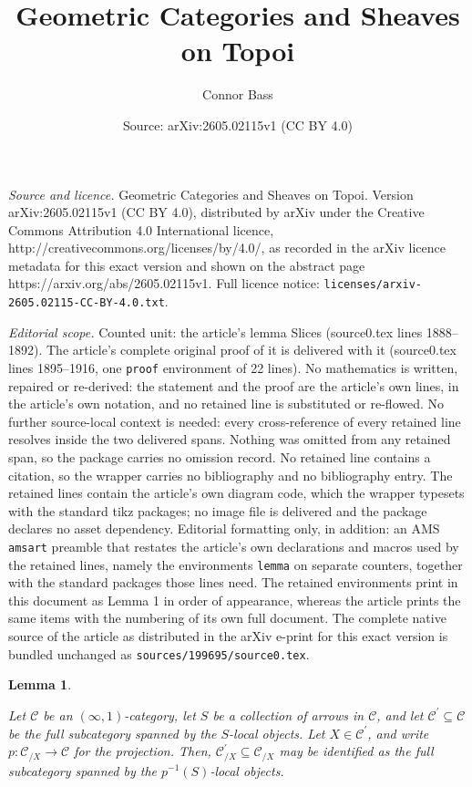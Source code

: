 \documentclass[10pt,a4paper]{amsart}
\title{Geometric Categories and Sheaves on Topoi}
\author{Connor Bass}
\date{Source: arXiv:2605.02115v1 (CC BY 4.0)}
\newtheorem{lemma}{Lemma}
\newcommand{\C}{\mathcal C}
\begin{document}
\maketitle

\noindent\emph{Source and licence.} Geometric Categories and Sheaves on Topoi. Version arXiv:2605.02115v1 (CC BY 4.0), distributed by arXiv under the Creative Commons Attribution 4.0 International licence, http://creativecommons.org/licenses/by/4.0/, as recorded in the arXiv licence metadata for this exact version and shown on the abstract page https://arxiv.org/abs/2605.02115v1. Full licence notice: \texttt{licenses/arxiv-2605.02115-CC-BY-4.0.txt}.\par\smallskip

\noindent\textit{Editorial scope.} Counted unit: the article's lemma Slices (source0.tex lines 1888--1892). The article's complete original proof of it is delivered with it (source0.tex lines 1895--1916, one \texttt{proof} environment of 22 lines). No mathematics is written, repaired or re-derived: the statement and the proof are the article's own lines, in the article's own notation, and no retained line is substituted or re-flowed.  No further source-local context is needed: every cross-reference of every retained line resolves inside the two delivered spans.  Nothing was omitted from any retained span, so the package carries no omission record.  No retained line contains a citation, so the wrapper carries no bibliography and no bibliography entry.  The retained lines contain the article's own diagram code, which the wrapper typesets with the standard tikz packages; no image file is delivered and the package declares no asset dependency.  Editorial formatting only, in addition: an AMS \texttt{amsart} preamble that restates the article's own declarations and macros used by the retained lines, namely the environments \texttt{lemma} on separate counters, together with the standard packages those lines need.  The retained environments print in this document as Lemma 1 in order of appearance, whereas the article prints the same items with the numbering of its own full document.  The complete native source of the article as distributed in the arXiv e-print for this exact version is bundled unchanged as \texttt{sources/199695/source0.tex}.
\begin{lemma}{}\label{Reflective Localizations and Slices}

    Let $\C$ be an $(\infty,1)$-category, let $S$ be a collection of arrows in $\C$, and let $\C^\prime\subseteq \C$ be the full subcategory spanned by the $S$-local objects. Let $X\in \C^\prime$, and write $p:\C_{/X}\rightarrow \C$ for the projection. Then, $\C^\prime_{/X}\subseteq \C_{/X}$ may be identified as the full subcategory spanned by the $p^{-1}(S)$-local objects. 

\end{lemma}
\end{document}
